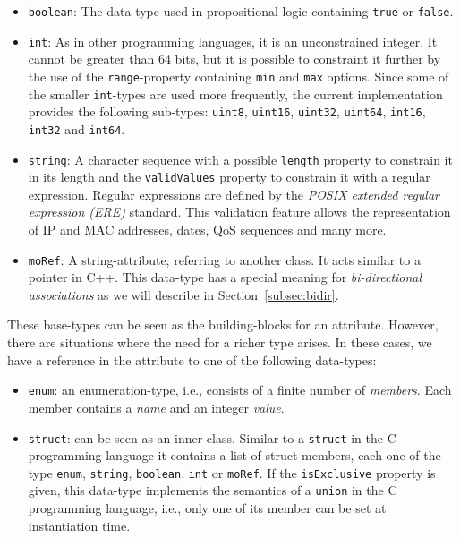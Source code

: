 \begin{itemize}
 \item \verb|boolean|: The data-type used in propositional logic containing \verb|true| or \verb|false|.
 
 \item \verb|int|: As in other programming languages, it is an unconstrained integer. It cannot be greater than 64 bits, but it is possible to constraint it further by the use of the \verb|range|-property containing \verb|min| and \verb|max| options. Since some of the smaller \verb|int|-types are used more frequently, the current implementation provides the following sub-types: \verb|uint8|, \verb|uint16|, \verb|uint32|, \verb|uint64|, \verb|int16|, \verb|int32| and \verb|int64|.
 
 \item \verb|string|: A character sequence with a possible \verb|length| property to constrain it in its length and the \verb|validValues| property to constrain it with a regular expression. Regular expressions are defined by the \emph{POSIX extended regular expression (ERE)} standard. This validation feature allows the representation of IP and MAC addresses, dates, QoS sequences and many more.
 
 \item \verb|moRef|: A string-attribute, referring to another class. It acts similar to a pointer in C++. This data-type has a special meaning for \emph{bi-directional associations} as we will describe in Section~\ref{subsec:bidir}.
\end{itemize}

These base-types can be seen as the building-blocks for an attribute. However, there are situations where the need for a richer type arises. In these cases, we have a reference in the attribute to one of the following data-types:

\begin{itemize}
 \item \verb|enum|: an enumeration-type, i.e., consists of a finite number of \emph{members}. Each member contains a \emph{name} and an integer \emph{value}.
 
 \item \verb|struct|: can be seen as an inner class. Similar to a \verb|struct| in the C programming language it contains a list of struct-members, each one of the type \verb|enum|, \verb|string|, \verb|boolean|, \verb|int| or \verb|moRef|. If the \verb|isExclusive| property is given, this data-type implements the semantics of a \verb|union| in the C programming language, i.e., only one of its member can be set at instantiation time.
\end{itemize}



